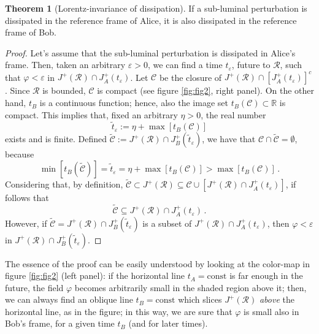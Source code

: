 \documentclass[a4paper, amsfonts, amssymb, amsmath, reprint, showkeys,  twoside, onecolumn,notitlepage,nofootinbib]{revtex4-1}
\theoremstyle{definition}
\theoremstyle{theorem}
\newtheorem{theorem}{Theorem}
\begin{document}
\begin{theorem}[Lorentz-invariance of dissipation]\label{theo}
If a sub-luminal perturbation is dissipated in the reference frame of Alice, it is also dissipated in the reference frame of Bob. 
\end{theorem}
\begin{proof}
Let's assume that the sub-luminal perturbation is dissipated in Alice's frame. Then, taken an arbitrary $\varepsilon >0$, we can find a time $t_\varepsilon$, future to $\mathcal{R}$, such that $\varphi < \varepsilon$ in $J^+(\mathcal{R}) \cap J^+_A (t_\varepsilon)$. Let $\mathcal{C}$ be the closure of $J^+(\mathcal{R}) \cap [J^+_A(t_\varepsilon)]^c$. Since $\mathcal{R}$ is bounded, $\mathcal{C}$ is compact (see figure \ref{fig:fig2}, right panel). On the other hand, $t_B$ is a continuous function; hence, also the image set $t_B(\mathcal{C}) \subset \mathbb{R}$ is compact. This implies that, fixed an arbitrary $\eta>0$, the real number 
\begin{equation}
\tilde{t}_\varepsilon := \eta + \max[t_B(\mathcal{C})]
\end{equation}
exists and is finite. Defined $\tilde{\mathcal{C}}:=J^+(\mathcal{R}) \cap J^+_B(\tilde{t}_\varepsilon)$, we have that $\mathcal{C} \cap \tilde{\mathcal{C}} = \emptyset$, because
\begin{equation}
\min[t_B(\tilde{\mathcal{C}})]= \tilde{t}_\varepsilon = \eta + \max[t_B(\mathcal{C})] > \max[t_B(\mathcal{C})] \, .
\end{equation}
Considering that, by definition, $\tilde{\mathcal{C}} \subset J^+(\mathcal{R}) \subseteq \mathcal{C} \cup [J^+(\mathcal{R}) \cap J^+_A (t_\varepsilon)]$, if follows that
\begin{equation}
 \tilde{\mathcal{C}} \subseteq J^+(\mathcal{R}) \cap J^+_A (t_\varepsilon) \, .
\end{equation}
However, if $ \tilde{\mathcal{C}} = J^+(\mathcal{R}) \cap J^+_B(\tilde{t}_\varepsilon)$ is a subset of $J^+(\mathcal{R}) \cap J^+_A (t_\varepsilon)$, then $\varphi <\varepsilon$ in $J^+(\mathcal{R}) \cap J^+_B(\tilde{t}_\varepsilon)$. 
\end{proof}
The essence of the proof can be easily understood by looking at the color-map in figure \ref{fig:fig2} (left panel): if the horizontal line $t_A = \text{const}$ is far enough in the future, the field $\varphi$ becomes arbitrarily small in the shaded region above it; then, we can always find an oblique line $t_B=\text{const}$ which slices $J^+(\mathcal{R})$ \textit{above} the horizontal line, as in the figure; in this way, we are sure that $\varphi$ is small also in Bob's frame, for a given time $t_B$ (and for later times). 
\end{document}
